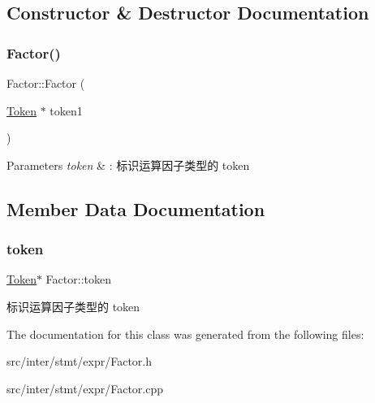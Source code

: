 \subsection{Constructor \& Destructor Documentation}
\mbox{\label{class_factor_af17f55c01064dcb353c47243931d095a}} 
\subsubsection{\texorpdfstring{Factor()}{Factor()}}
{\footnotesize\ttfamily Factor\+::\+Factor (\begin{DoxyParamCaption}\item[{\hyperlink{class_token}{Token} $\ast$}]{token1 }\end{DoxyParamCaption})}


\begin{DoxyParams}{Parameters}
{\em token} & \+: 标识运算因子类型的 token \\
\hline
\end{DoxyParams}


\subsection{Member Data Documentation}
\mbox{\label{class_factor_ab2c56fe952c0e3dad6006950e166495b}} 
\subsubsection{\texorpdfstring{token}{token}}
{\footnotesize\ttfamily \hyperlink{class_token}{Token}$\ast$ Factor\+::token}

标识运算因子类型的 token 

The documentation for this class was generated from the following files\+:\begin{DoxyCompactItemize}
\item 
src/inter/stmt/expr/Factor.\+h\item 
src/inter/stmt/expr/Factor.\+cpp\end{DoxyCompactItemize}

